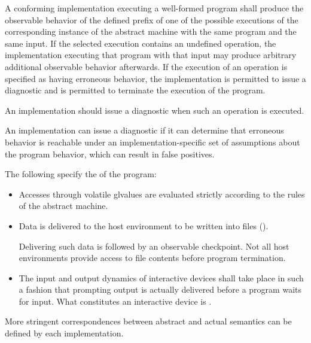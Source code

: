 A conforming implementation executing a well-formed program shall
produce the observable behavior
of the defined prefix
of one of the possible executions
of the corresponding instance
of the abstract machine with the
same program and the same input.
%
If the selected execution contains an undefined operation,
the implementation executing that program with that input
may produce arbitrary additional observable behavior afterwards.
If the execution of an operation is specified as having erroneous behavior,
the implementation is permitted to issue a diagnostic and
is permitted to terminate the execution of the program.

\pnum
\recommended
An implementation should issue a diagnostic when such an operation is executed.
\begin{note}
An implementation can issue a diagnostic
if it can determine that erroneous behavior is reachable
under an implementation-specific set of assumptions about the program behavior,
which can result in false positives.
\end{note}

\pnum
{}%
The following specify the
of the program:
\begin{itemize}
\item
Accesses through volatile glvalues are evaluated strictly according to the
rules of the abstract machine.
\item
Data is delivered to the host environment to be written into files ().

\begin{note}
Delivering such data
is followed by an observable checkpoint.
Not all host environments provide access to file contents before program termination.
\end{note}

\item
The input and output dynamics of interactive devices shall take
place in such a fashion that prompting output is actually delivered before a program waits for input. What constitutes an interactive device is
.
\end{itemize}

\begin{note}
More stringent correspondences between abstract and actual
semantics can be defined by each implementation.
\end{note}
%

